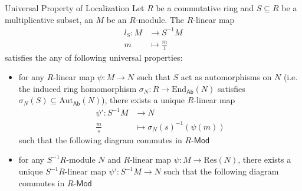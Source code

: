 \begin{proposition}{Universal Property of Localization}{}
    Let $R$ be a commutative ring and $S\subseteq R$ be a multiplicative subset, an $M$ be an $R$-module. The $R$-linear map
    \begin{align*}
        l_S:M&\longrightarrow S^{-1}M\\
         m&\longmapsto \frac{m}{1}
    \end{align*}
    satisfies the any of following universal properties: 
    \begin{itemize}
        \item for any $R$-linear map $\psi:M\to N$ such that $S$ act as automorphisms on $N$ (i.e. the induced ring homomorphism $\sigma_{N}:R\to\mathrm{End}_{\mathsf{Ab}}(N)$ satisfies $\sigma_{N}(S)\subseteq \mathrm{Aut}_{\mathsf{Ab}}(N)$), there exists a unique $R$-linear map
        \begin{align*}
            \psi':S^{-1}M&\longrightarrow N\\
            \frac{m}{s}&\longmapsto \sigma_{N}(s)^{-1}(\psi(m))
        \end{align*}
        such that the following diagram commutes in $R\text{-}\mathsf{Mod}$
        \begin{center}
        \end{center}
        \item for any $S^{-1}R$-module $N$ and $R$-linear map $\psi:M\to \mathrm{Res}(N)$, there exists a unique $S^{-1}R$-linear map $\psi':S^{-1}M\to N$ such that the following diagram commutes in $R\text{-}\mathsf{Mod}$
        \begin{center}
        \end{center}
    \end{itemize}
\end{proposition}


